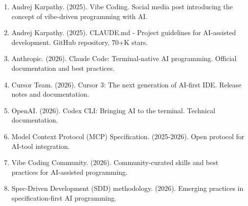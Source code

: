\begin{enumerate}
  \item Andrej Karpathy. (2025). Vibe Coding. Social media post introducing the concept of vibe-driven programming with AI.
  \item Andrej Karpathy. (2025). CLAUDE.md - Project guidelines for AI-assisted development. GitHub repository, 70+K stars.
  \item Anthropic. (2026). Claude Code: Terminal-native AI programming. Official documentation and best practices.
  \item Cursor Team. (2026). Cursor 3: The next generation of AI-first IDE. Release notes and documentation.
  \item OpenAI. (2026). Codex CLI: Bringing AI to the terminal. Technical documentation.
  \item Model Context Protocol (MCP) Specification. (2025-2026). Open protocol for AI-tool integration.
  \item Vibe Coding Community. (2026). Community-curated skills and best practices for AI-assisted programming.
  \item Spec-Driven Development (SDD) methodology. (2026). Emerging practices in specification-first AI programming.
\end{enumerate}
